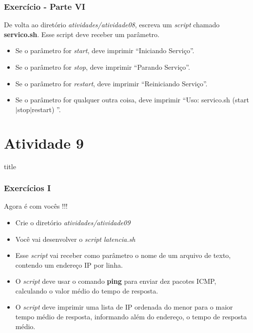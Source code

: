 \documentclass{beamer}
\begin{document}
   \begin{frame}
      \frametitle{Exercício - Parte VI}
      De volta ao diretório \textit{atividades/atividade08}, escreva um \textit{script} chamado \textbf{servico.sh}. Esse script deve receber um parâmetro.
      \begin{itemize}
         \item Se o parâmetro for \textit{start}, deve imprimir \textquotedblleft Iniciando Serviço\textquotedblright.
         \item Se o parâmetro for \textit{stop}, deve imprimir \textquotedblleft Parando Serviço\textquotedblright.
         \item Se o parâmetro for \textit{restart}, deve imprimir \textquotedblleft Reiniciando Serviço\textquotedblright.
         \item Se o parâmetro for qualquer outra coisa,  deve imprimir \textquotedblleft Uso: servico.sh (start$|$stop$|$restart) \textquotedblright.
      \end{itemize}
   \end{frame}

\section{Atividade 9}
   \begin{frame}
      \begin{beamercolorbox}[sep=8pt,center,shadow=true,rounded=true]{title}
      \insertsectionhead\par%
      \end{beamercolorbox}
   \end{frame}

   \begin{frame}
      \frametitle{Exercícios I}
      Agora é com vocês !!!
      \begin{itemize}
         \item Crie o diretório \textit{atividades/atividade09}
	 \item Você vai desenvolver o \textit{script} \textit{latencia.sh}
	 \item Esse \textit{script} vai receber como parâmetro o nome de um arquivo de texto, contendo um endereço IP por linha.
	 \item O \textit{script} deve usar o comando \textbf{ping} para enviar dez pacotes ICMP, calculando o valor médio do tempo de resposta.
	 \item O \textit{script} deve imprimir uma lista de IP ordenada do menor para o maior tempo médio de resposta, informando além do endereço, o tempo de resposta médio.
      \end{itemize}
   \end{frame}
\end{document}
